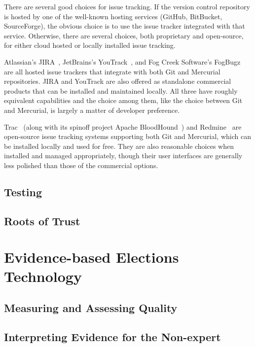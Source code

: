 There are several good choices for issue tracking. If the version
control repository is hosted by one of the well-known hosting services
(GitHub, BitBucket, SourceForge), the obvious choice is to use the
issue tracker integrated with that service. Otherwise, there are
several choices, both proprietary and open-source, for either cloud
hosted or locally installed issue tracking.

Atlassian's JIRA~\cite{JIRA}, JetBrains's YouTrack~\cite{YouTrack},
and Fog Creek Software's FogBugz~\cite{FogBugz} are all hosted issue
trackers that integrate with both Git and Mercurial repositories. JIRA
and YouTrack are also offered as standalone commercial products that
can be installed and maintained locally. All three have roughly
equivalent capabilities and the choice among them, like the choice
between Git and Mercurial, is largely a matter of developer
preference.

Trac~\cite{Trac} (along with its spinoff project Apache
BloodHound~\cite{ApacheBloodhound}) and Redmine~\cite{Redmine} are
open-source issue tracking systems supporting both Git and Mercurial,
which can be installed locally and used for free. They are also
reasonable choices when installed and managed appropriately, though
their user interfaces are generally less polished than those of the
commercial options.

\subsection{Testing}

\subsection{Roots of Trust}

\section{Evidence-based Elections Technology}

\subsection{Measuring and Assessing Quality}

\subsection{Interpreting Evidence for the Non-expert}

